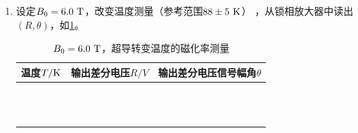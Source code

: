 \documentclass[11pt,a4paper]{ctexart}
\newcommand{\unit}[1]{\rm \ #1}
\begin{document}
\begin{enumerate}
  \item
设定$B_0 = 6.0\unit{T}$，改变温度测量（参考范围$88\pm5\unit{K}$） ，从锁相放大器中读出$(R,\theta)$，如\cref{table4}。
  \begin{table}[H]
\centering
\caption{$B_0 = 6.0\unit{T}$，超导转变温度的磁化率测量\label{table4}}
\begin{tabular}{|p{32mm}|p{32mm}|p{32mm}|}
\hline
温度$T/{\rm K}$ & 输出差分电压$R/{V}$ & 输出差分电压信号幅角$\theta$ \\ \hline
& & \\ \hline
  & & \\ \hline
& & \\ \hline
   & & \\ \hline
    & & \\ \hline
 & & \\ \hline
  &  &\\ \hline
  &  &\\ \hline
  &  &\\ \hline
  &  &\\ \hline
  &  &\\ \hline
  &  &\\ \hline
  \end{tabular}
  \end{table}
 

\end{enumerate}
\end{document}
